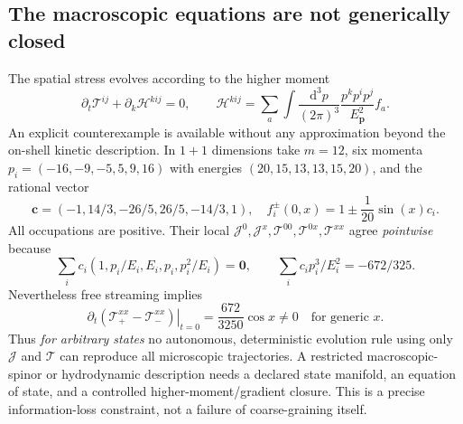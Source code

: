 \documentclass[11pt,a4paper]{article}
\newcommand{\dd}{\mathrm d}
\newcommand{\TT}{\mathcal T}
\newcommand{\JJ}{\mathcal J}
\begin{document}
\subsection{The macroscopic equations are not generically closed}
The spatial stress evolves according to the higher moment
\begin{equation}\label{eq:qgd006-higher}
\partial_t\TT^{ij}+\partial_k\mathcal H^{kij}=0,\qquad
\mathcal H^{kij}=\sum_a\int\frac{\dd^3p}{(2\pi)^3}\frac{p^kp^ip^j}{E_{\bm p}^2}f_a.
\end{equation}
An explicit counterexample is available without any approximation beyond the on-shell kinetic description. In $1+1$ dimensions take $m=12$, six momenta $p_i=(-16,-9,-5,5,9,16)$ with energies $(20,15,13,13,15,20)$, and the rational vector
\begin{equation}\label{eq:qgd006-null}
\bm c=(-1,14/3,-26/5,26/5,-14/3,1),\quad
f_i^\pm(0,x)=1\pm\frac1{20}\sin(x)c_i.
\end{equation}
All occupations are positive. Their local $\JJ^0,\JJ^x,\TT^{00},\TT^{0x},\TT^{xx}$ agree \emph{pointwise} because
\begin{equation}\label{eq:qgd006-null-check}
\sum_i c_i(1,p_i/E_i,E_i,p_i,p_i^2/E_i)=\bm0,
\qquad\sum_i c_i p_i^3/E_i^2=-672/325.
\end{equation}
Nevertheless free streaming implies
\begin{equation}\label{eq:qgd006-diff}
\left.\partial_t(\TT^{xx}_{+}-\TT^{xx}_{-})\right|_{t=0}=\frac{672}{3250}\cos x\neq0
\quad\text{for generic $x$.}
\end{equation}
Thus \emph{for arbitrary states} no autonomous, deterministic evolution rule using only $\JJ$ and $\TT$ can reproduce all microscopic trajectories. A restricted macroscopic-spinor or hydrodynamic description needs a declared state manifold, an equation of state, and a controlled higher-moment/gradient closure. This is a precise information-loss constraint, not a failure of coarse-graining itself.
\end{document}
